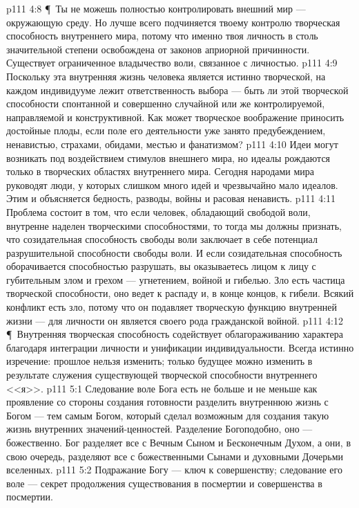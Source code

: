 \vs p111 4:8 \P\ Ты не можешь полностью контролировать внешний мир --- окружающую среду. Но лучше всего подчиняется твоему контролю творческая способность внутреннего мира, потому что именно твоя личность в столь значительной степени освобождена от законов априорной причинности. Существует ограниченное владычество воли, связанное с личностью.
\vs p111 4:9 Поскольку эта внутренняя жизнь человека является истинно творческой, на каждом индивидууме лежит ответственность выбора --- быть ли этой творческой способности спонтанной и совершенно случайной или же контролируемой, направляемой и конструктивной. Как может творческое воображение приносить достойные плоды, если поле его деятельности уже занято предубеждением, ненавистью, страхами, обидами, местью и фанатизмом?
\vs p111 4:10 Идеи могут возникать под воздействием стимулов внешнего мира, но идеалы рождаются только в творческих областях внутреннего мира. Сегодня народами мира руководят люди, у которых слишком много идей и чрезвычайно мало идеалов. Этим и объясняется бедность, разводы, войны и расовая ненависть.
\vs p111 4:11 Проблема состоит в том, что если человек, обладающий свободой воли, внутренне наделен творческими способностями, то тогда мы должны признать, что созидательная способность свободы воли заключает в себе потенциал разрушительной способности свободы воли. И если созидательная способность оборачивается способностью разрушать, вы оказываетесь лицом к лицу с губительным злом и грехом --- угнетением, войной и гибелью. Зло есть частица творческой способности, оно ведет к распаду и, в конце концов, к гибели. Всякий конфликт есть зло, потому что он подавляет творческую функцию внутренней жизни --- для личности он является своего рода гражданской войной.
\vs p111 4:12 \P\ Внутренняя творческая способность содействует облагораживанию характера благодаря интеграции личности и унификации индивидуальности. Всегда истинно изречение: прошлое нельзя изменить; только будущее можно изменить в результате служения существующей творческой способности внутреннего <<я>>.
\vs p111 5:1 Следование воле Бога есть не больше и не меньше как проявление со стороны создания готовности разделить внутреннюю жизнь с Богом --- тем самым Богом, который сделал возможным для создания такую жизнь внутренних значений\hyp{}ценностей. Разделение Богоподобно, оно --- божественно. Бог разделяет все с Вечным Сыном и Бесконечным Духом, а они, в свою очередь, разделяют все с божественными Сынами и духовными Дочерьми вселенных.
\vs p111 5:2 Подражание Богу --- ключ к совершенству; следование его воле --- секрет продолжения существования в посмертии и совершенства в посмертии.
